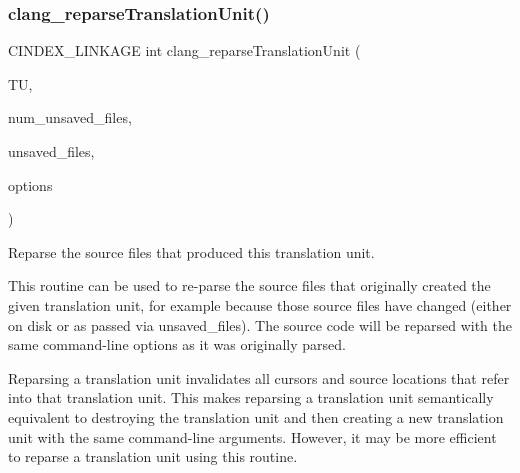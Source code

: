 \subsubsection{\texorpdfstring{clang\+\_\+reparse\+Translation\+Unit()}{clang\_reparseTranslationUnit()}}
{\footnotesize\ttfamily C\+I\+N\+D\+E\+X\+\_\+\+L\+I\+N\+K\+A\+GE int clang\+\_\+reparse\+Translation\+Unit (\begin{DoxyParamCaption}\item[{\hyperlink{group__CINDEX_gacdb7815736ca709ce9a5e1ec2b7e16ac}{C\+X\+Translation\+Unit}}]{TU,  }\item[{unsigned}]{num\+\_\+unsaved\+\_\+files,  }\item[{struct \hyperlink{structCXUnsavedFile}{C\+X\+Unsaved\+File} $\ast$}]{unsaved\+\_\+files,  }\item[{unsigned}]{options }\end{DoxyParamCaption})}



Reparse the source files that produced this translation unit. 

This routine can be used to re-\/parse the source files that originally created the given translation unit, for example because those source files have changed (either on disk or as passed via {\ttfamily unsaved\+\_\+files}). The source code will be reparsed with the same command-\/line options as it was originally parsed.

Reparsing a translation unit invalidates all cursors and source locations that refer into that translation unit. This makes reparsing a translation unit semantically equivalent to destroying the translation unit and then creating a new translation unit with the same command-\/line arguments. However, it may be more efficient to reparse a translation unit using this routine.


